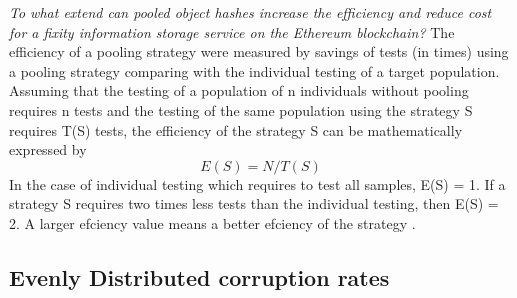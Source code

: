 \textit{To what extend can pooled object hashes increase the efficiency and reduce cost for a fixity information storage service on the Ethereum blockchain?}
\label{sec:rq2}
The efficiency of a pooling strategy were measured by savings of tests (in times) using a pooling strategy comparing with the individual testing of a target population. Assuming that the testing of a population of n individuals without pooling requires n tests and the testing of the same population using the strategy S requires T(S) tests, the efficiency of the strategy S can be mathematically expressed by 
\begin{equation}\label{eq:expected_throughput}
    E(S) = N/T(S)
\end{equation}
In the case of individual testing which requires to test all samples, E(S) = 1. If a strategy S requires two times less tests than the individual testing, then E(S) = 2. A larger efciency value means a better efciency of the strategy \cite[4]{vzilinskas2021pooled}.
\subsection{Evenly Distributed corruption rates}
